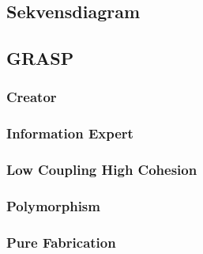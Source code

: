 \subsection{Sekvensdiagram}
\subsection{GRASP}
\subsubsection{Creator}
\subsubsection{Information Expert}
\subsubsection{Low Coupling High Cohesion}
\subsubsection{Polymorphism}
\subsubsection{Pure Fabrication}
